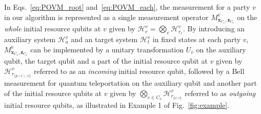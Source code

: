 \documentclass[preprintnumbers,aps,amsmath,amssymb,pra,twocolumn,showpacs,superscriptaddress,floatfix]{revtex4-1}
\theoremstyle{plain}
\theoremstyle{definition}
\theoremstyle{remark}
\begin{document}
In Eqs.~\eqref{eq:POVM_root} and~\eqref{eq:POVM_each}, the measurement for a party $v$ in our algorithm is represented as a single measurement operator $M^v_{\boldsymbol{x}_{C_v},\boldsymbol{z}_{C_v}}$ on the \textit{whole} initial resource qubits at $v$ given by $\mathcal{H}_r^v = \bigotimes_{e} \mathcal{H}_{r_e}^v$.
By introducing an auxiliary system $\mathcal{H}_a^v$ and an target system $\mathcal{H}_t^v$ in fixed states at each party $v$,
$M^v_{\boldsymbol{x}_{C_v},\boldsymbol{z}_{C_v}}$ can be implemented by a unitary transformation $U_v$ on 
the auxiliary qubit, the target qubit and a part of the initial resource qubit at $v$ given by $\mathcal{H}_{r_{\{p(v),v\}}}^v$ referred to as an \textit{incoming} initial resource qubit, followed by a Bell measurement for quantum teleportation on the auxiliary qubit and another part of the initial resource qubits at $v$ given by $\bigotimes_{c\in C_v}\mathcal{H}_{r_{\{ v, c\} }}^v$ referred to as \textit{outgoing} initial resource qubits, as illustrated in Example 1 of Fig.~\ref{fig:example}.
\end{document}
